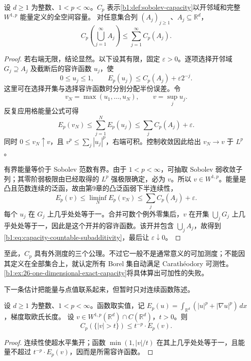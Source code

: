 \begin{theorem}\label{b1:thm:sobolev-capacity-subadditive}
设 \(d\geq1\) 为整数、\(1<p<\infty\)。\(C_p\) 表示\cref{b1:def:sobolev-capacity}以开邻域和完整 \(W^{1,p}\) 能量定义的全空间容量。
对任意集合列 \((A_j)_{j\ge1}\)、\(A_j\subseteq\mathbb R^d\)，
\begin{equation}\label{b1:eq:capacity-countable-subadditivity}
 C_p\left(\bigcup_{j=1}^\infty A_j\right)
 \le\sum_{j=1}^\infty C_p(A_j).
\end{equation}
\end{theorem}
\begin{proof}
若右端无限，结论显然。以下设其有限，固定 \(\varepsilon>0\)。逐项选择开邻域 \(G_j\supseteq A_j\) 及截断后的容许函数 \(u_j\)，使
\[
 0\le u_j\le1,\qquad
 E_p(u_j)\le C_p(A_j)+\varepsilon2^{-j}.
\]
这里可在选择开集与选择容许函数时分别分配半份误差。令
\[
 v_N=\max(u_1,\ldots,u_N),\qquad v=\sup_j u_j.
\]
反复应用格能量公式可得
\[
 E_p(v_N)\le\sum_{j=1}^N E_p(u_j)
 \le\sum_jC_p(A_j)+\varepsilon.
\]
同时 \(0\le v_N\uparrow v\)，且 \(v^p\le\sum_j|u_j|^p\)，右端可积。控制收敛因此给出 \(v_N\to v\) 于 \(L^p\)。

有界能量等价于 Sobolev 范数有界。由于 \(1<p<\infty\)，可抽取 Sobolev 弱收敛子列；其零阶弱极限由已经取得的 \(L^p\) 强极限确定，必为 \(v\)。所以 \(v\in W^{1,p}\)。能量是凸且范数连续的泛函，故由第9章的凸泛函弱下半连续性，
\[
 E_p(v)\le\liminf_N E_p(v_N)
 \le\sum_jC_p(A_j)+\varepsilon.
\]
每个 \(u_j\) 在 \(G_j\) 上几乎处处等于一。合并可数个例外零集后，\(v\) 在开集 \(\bigcup_jG_j\) 上几乎处处等于一，因此是这个开并的容许函数。该开并包含 \(\bigcup_jA_j\)，故得到\eqref{b1:eq:capacity-countable-subadditivity}，最后让 \(\varepsilon\downarrow0\)。
\end{proof}

至此，\(C_p\) 具有外测度的三个公理。不过它一般不是通常意义的可加测度；不能因其定义在全部集合上，就认定所有 Borel 集自动满足 Carathéodory 可测性。\cref{b1:ex:26-one-dimensional-exact-capacity}将具体算出可加性的失败。

\ProseParagraphBreak

下一条估计把能量与点值联系起来，但暂时只对连续函数陈述。

\begin{lemma}\label{b1:lem:continuous-capacity-level-set}
设 \(d\geq1\) 为整数、\(1<p<\infty\)。函数取实值，记 \(E_p(u)=\int_{\mathbb R^d}(|u|^p+|\nabla u|^p)\,dx\)，梯度取欧氏长度。
设 \(v\in W^{1,p}(\mathbb R^d)\cap C(\mathbb R^d)\)，\(t>0\)。则
\[
 C_p(\{|v|>t\})\le t^{-p}\cdot E_p(v).
\]
\end{lemma}
\begin{proof}
连续性使超水平集开；函数 \(\min(1,|v|/t)\) 在其上几乎处处等于一，且能量不超过 \(t^{-p}\cdot E_p(v)\)，因而是所需容许函数。
\end{proof}

